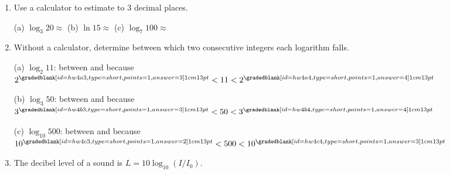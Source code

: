 \documentclass[10pt]{article}
\begin{document}
\begin{enumerate}[itemsep=14pt]
\item Use a calculator to estimate to 3 decimal places.

      \vspace{0.04in}
      (a) $\log_3 20 \approx $ \smash{\gradedblank[id=hw3a, type=short, check=numeric, tolerance=0.0005, points=1, answer={2.727}]{3cm}{13pt}} \qquad
      (b) $\ln 15 \approx $ \smash{\gradedblank[id=hw3b, type=short, check=numeric, tolerance=0.0005, points=1, answer={2.708}]{3cm}{13pt}} \qquad
      (c) $\log_7 100 \approx $ \smash{\gradedblank[id=hw3c, type=short, check=numeric, tolerance=0.0005, points=1, answer={2.367}]{3cm}{13pt}}

\item Without a calculator, determine between which two consecutive integers each logarithm falls.

      \vspace{0.04in}
      (a) $\log_2 11$: between \smash{\gradedblank[id=hw4a1, type=short, points=1, answer={3}]{1cm}{13pt}} and \smash{\gradedblank[id=hw4a2, type=short, points=1, answer={4}]{1cm}{13pt}}
            \hspace{0.5em} because $2^{\smash{\gradedblank[id=hw4a3, type=short, points=1, answer={3}]{1cm}{13pt}}} < 11 < 2^{\smash{\gradedblank[id=hw4a4, type=short, points=1, answer={4}]{1cm}{13pt}}}$

      \vspace{0.06in}
      (b) $\log_3 50$: between \smash{\gradedblank[id=hw4b1, type=short, points=1, answer={3}]{1cm}{13pt}} and \smash{\gradedblank[id=hw4b2, type=short, points=1, answer={4}]{1cm}{13pt}}
            \hspace{0.5em} because $3^{\smash{\gradedblank[id=hw4b3, type=short, points=1, answer={3}]{1cm}{13pt}}} < 50 < 3^{\smash{\gradedblank[id=hw4b4, type=short, points=1, answer={4}]{1cm}{13pt}}}$

      \vspace{0.06in}
      (c) $\log_{10} 500$: between \smash{\gradedblank[id=hw4c1, type=short, points=1, answer={2}]{1cm}{13pt}} and \smash{\gradedblank[id=hw4c2, type=short, points=1, answer={3}]{1cm}{13pt}}
            \hspace{0.5em} because $10^{\smash{\gradedblank[id=hw4c3, type=short, points=1, answer={2}]{1cm}{13pt}}} < 500 < 10^{\smash{\gradedblank[id=hw4c4, type=short, points=1, answer={3}]{1cm}{13pt}}}$

\item The decibel level of a sound is $L = 10\log_{10}(I / I_0)$.


\end{enumerate}
\end{document}
